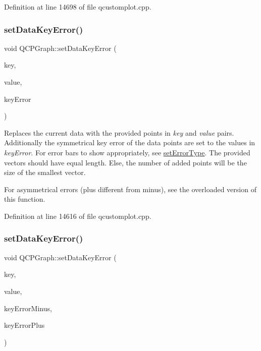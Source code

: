 Definition at line 14698 of file qcustomplot.\+cpp.

\mbox{\label{class_q_c_p_graph_abce9f07c0d722bc3e4fa7bd73c7e5dfa}} 
\subsubsection{\texorpdfstring{set\+Data\+Key\+Error()}{setDataKeyError()}\hspace{0.1cm}{\footnotesize\ttfamily [1/2]}}
{\footnotesize\ttfamily void Q\+C\+P\+Graph\+::set\+Data\+Key\+Error (\begin{DoxyParamCaption}\item[{const Q\+Vector$<$ double $>$ \&}]{key,  }\item[{const Q\+Vector$<$ double $>$ \&}]{value,  }\item[{const Q\+Vector$<$ double $>$ \&}]{key\+Error }\end{DoxyParamCaption})}

Replaces the current data with the provided points in {\itshape key} and {\itshape value} pairs. Additionally the symmetrical key error of the data points are set to the values in {\itshape key\+Error}. For error bars to show appropriately, see \hyperlink{class_q_c_p_graph_ac3614d799c3894f2bc646e99c7f73d38}{set\+Error\+Type}. The provided vectors should have equal length. Else, the number of added points will be the size of the smallest vector.

For asymmetrical errors (plus different from minus), see the overloaded version of this function. 

Definition at line 14616 of file qcustomplot.\+cpp.

\mbox{\label{class_q_c_p_graph_ac15c749c5fedf740d5692c6fe67143b8}} 
\subsubsection{\texorpdfstring{set\+Data\+Key\+Error()}{setDataKeyError()}\hspace{0.1cm}{\footnotesize\ttfamily [2/2]}}
{\footnotesize\ttfamily void Q\+C\+P\+Graph\+::set\+Data\+Key\+Error (\begin{DoxyParamCaption}\item[{const Q\+Vector$<$ double $>$ \&}]{key,  }\item[{const Q\+Vector$<$ double $>$ \&}]{value,  }\item[{const Q\+Vector$<$ double $>$ \&}]{key\+Error\+Minus,  }\item[{const Q\+Vector$<$ double $>$ \&}]{key\+Error\+Plus }\end{DoxyParamCaption})}

